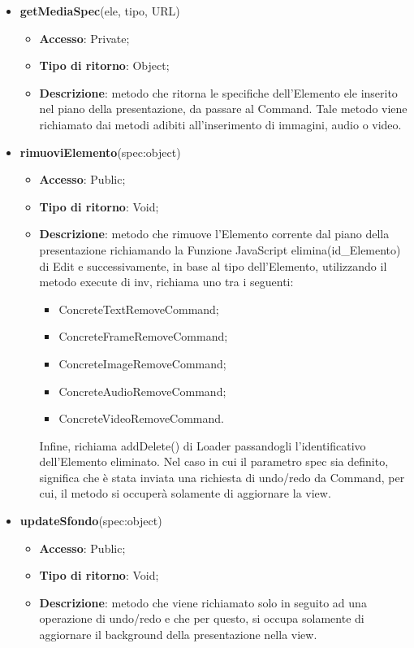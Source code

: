 {{\begin{itemize}
			\item \textbf{getMediaSpec}(ele, tipo, URL)
			\begin{itemize}
				\item \textbf{Accesso}: Private;
				\item \textbf{Tipo di ritorno}: Object;
				\item \textbf{Descrizione}: metodo che ritorna le specifiche dell'Elemento ele inserito nel piano della presentazione, da passare al Command. Tale metodo viene richiamato dai metodi adibiti all'inserimento di immagini, audio o video.
			\end{itemize}
			\item \textbf{rimuoviElemento}(spec:object)
			\begin{itemize}
				\item \textbf{Accesso}: Public;
				\item \textbf{Tipo di ritorno}: Void;
				\item \textbf{Descrizione}: metodo che rimuove l'Elemento corrente dal piano della presentazione richiamando la Funzione\ped{g} JavaScript elimina(id\_Elemento) di Edit e successivamente, in base al tipo dell'Elemento, utilizzando il metodo execute di inv, richiama uno tra i seguenti:
				\begin{itemize}
					\item ConcreteTextRemoveCommand;
					\item ConcreteFrameRemoveCommand;
					\item ConcreteImageRemoveCommand;
					\item ConcreteAudioRemoveCommand;
					\item ConcreteVideoRemoveCommand.
				\end{itemize}
				 Infine, richiama addDelete() di Loader passandogli l'identificativo dell'Elemento eliminato. Nel caso in cui il parametro spec sia definito, significa che è stata inviata una richiesta di undo/redo da Command, per cui, il metodo si occuperà solamente di aggiornare la view.
			\end{itemize}
			\item \textbf{updateSfondo}(spec:object)
			\begin{itemize}
				\item \textbf{Accesso}: Public;
				\item \textbf{Tipo di ritorno}: Void;
				\item \textbf{Descrizione}: metodo che viene richiamato solo in seguito ad una operazione di undo/redo e che per questo, si occupa solamente di aggiornare il background della presentazione nella view.

\end{itemize}
\end{itemize}}}
